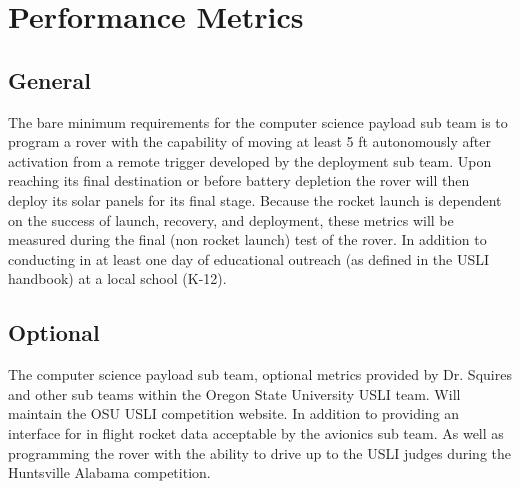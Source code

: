 \documentclass[onecolumn, draftclsnofoot,10pt, compsoc]{IEEEtran}
\begin{document}
\section{Performance Metrics}
\subsection{General}
The bare minimum requirements for the computer science payload sub team is to program a rover with the capability of moving at least 5 ft autonomously after activation from a remote trigger developed by the deployment sub team. Upon reaching its final destination or before battery depletion the rover will then deploy its solar panels for its final stage. Because the rocket launch is dependent on the success of launch, recovery, and deployment, these metrics will be measured during the final (non rocket launch) test of the rover. In addition to conducting in at least one day of educational outreach (as defined in the USLI handbook) at a local school (K-12).
\subsection{Optional}
The computer science payload sub team, optional metrics provided by Dr. Squires and other sub teams within the Oregon State University USLI team. Will maintain the OSU USLI competition website. In addition to providing an interface for in flight rocket data acceptable by the avionics sub team. As well as programming the rover with the ability to drive up to the USLI judges during the Huntsville Alabama competition.
\nocite{*}%


\end{document}
